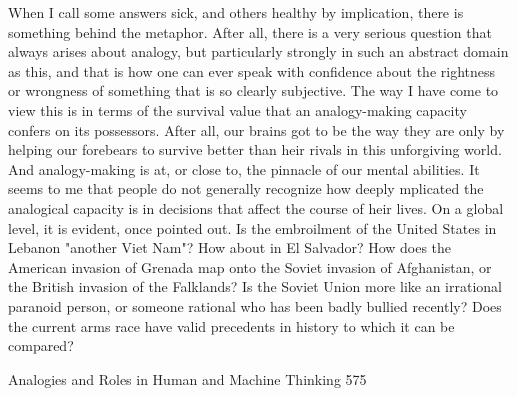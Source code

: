         When I call some answers sick, and others healthy by implication, there is
something behind the metaphor. After all, there is a very serious question that always
arises about analogy, but particularly strongly in such an abstract domain as this, and
that is how one can ever speak with confidence about the rightness or wrongness of
something that is so clearly subjective. The way I have come to view this is in terms
of the survival value that an analogy-making capacity confers on its possessors. After
all, our brains got to be the way they are only by helping our forebears to survive
better than heir rivals in this unforgiving world. And analogy-making is at, or close to,
the pinnacle of our mental abilities.
        It seems to me that people do not generally recognize how deeply mplicated
the analogical capacity is in decisions that affect the course of heir lives. On a global
level, it is evident, once pointed out. Is the embroilment of the United States in
Lebanon "another Viet Nam"? How about in El Salvador? How does the American
invasion of Grenada map onto the Soviet invasion of Afghanistan, or the British
invasion of the Falklands? Is the Soviet Union more like an irrational paranoid person,
or someone rational who has been badly bullied recently? Does the current arms race
have valid precedents in history to which it can be compared?




Analogies and Roles in Human and Machine Thinking                                    575

